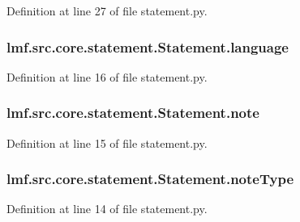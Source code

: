 Definition at line 27 of file statement.\+py.

\hypertarget{classlmf_1_1src_1_1core_1_1statement_1_1_statement_a71a5b6eaf4bad349ab3399fbea06b88d}{
\subsubsection[{language}]{\setlength{\rightskip}{0pt plus 5cm}lmf.\+src.\+core.\+statement.\+Statement.\+language}}\label{classlmf_1_1src_1_1core_1_1statement_1_1_statement_a71a5b6eaf4bad349ab3399fbea06b88d}


Definition at line 16 of file statement.\+py.

\hypertarget{classlmf_1_1src_1_1core_1_1statement_1_1_statement_a231fe52b0b7ba3deb6d0993987dddaf0}{
\subsubsection[{note}]{\setlength{\rightskip}{0pt plus 5cm}lmf.\+src.\+core.\+statement.\+Statement.\+note}}\label{classlmf_1_1src_1_1core_1_1statement_1_1_statement_a231fe52b0b7ba3deb6d0993987dddaf0}


Definition at line 15 of file statement.\+py.

\hypertarget{classlmf_1_1src_1_1core_1_1statement_1_1_statement_abc61d06d03119e6e12d5c3854afc93c1}{
\subsubsection[{note\+Type}]{\setlength{\rightskip}{0pt plus 5cm}lmf.\+src.\+core.\+statement.\+Statement.\+note\+Type}}\label{classlmf_1_1src_1_1core_1_1statement_1_1_statement_abc61d06d03119e6e12d5c3854afc93c1}


Definition at line 14 of file statement.\+py.

